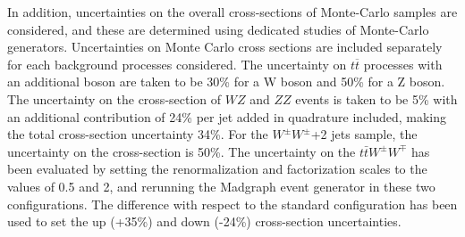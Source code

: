 
In addition, uncertainties on the overall cross-sections of Monte-Carlo samples are considered,
and these are determined using dedicated studies of Monte-Carlo generators.
Uncertainties on Monte Carlo cross sections are included separately for each background processes considered.
The uncertainty on $t \overline{t}$ processes with an additional boson are taken to be 30\% for a W boson 
and 50\% for a Z boson.%
The uncertainty on the cross-section of $WZ$ and $ZZ$ events is taken to be 5\% with an additional contribution of 24\% per jet added in quadrature included, making the total cross-section uncertainty 34\%.
For the $W^{\pm}W^{\pm}$+2 jets sample, the uncertainty on the cross-section is 50\%.
The uncertainty on the $t\bar{t}W^{\pm}W^{\mp}$ has been evaluated by setting the renormalization
and factorization scales to the values of 0.5 and 2, and rerunning the Madgraph event generator 
in these two configurations. 
The difference with respect to the standard configuration has been used to set the up
(+35\%) and down (-24\%) cross-section uncertainties.



